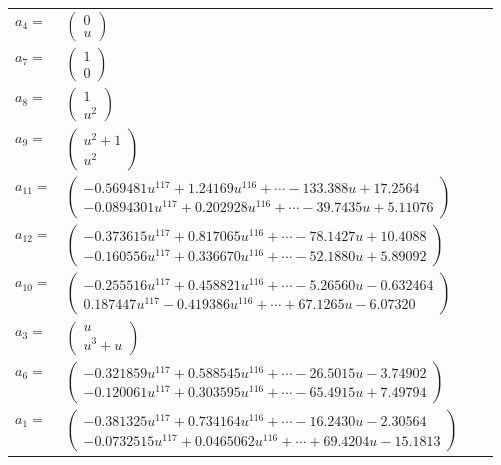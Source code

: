 \documentclass[1p]{elsarticle_modified}
\theoremstyle{definition}
\begin{document}
\begin{tabular}{m{7pt} m{180pt} m{7pt} m{180pt} }
\flushright $a_{4}=$&$\begin{pmatrix}0\\u\end{pmatrix}$ \\
\flushright $a_{7}=$&$\begin{pmatrix}1\\0\end{pmatrix}$ \\
\flushright $a_{8}=$&$\begin{pmatrix}1\\u^2\end{pmatrix}$ \\
\flushright $a_{9}=$&$\begin{pmatrix}u^2+1\\u^2\end{pmatrix}$ \\
\flushright $a_{11}=$&$\begin{pmatrix}-0.569481 u^{117}+1.24169 u^{116}+\cdots-133.388 u+17.2564\\-0.0894301 u^{117}+0.202928 u^{116}+\cdots-39.7435 u+5.11076\end{pmatrix}$ \\
\flushright $a_{12}=$&$\begin{pmatrix}-0.373615 u^{117}+0.817065 u^{116}+\cdots-78.1427 u+10.4088\\-0.160556 u^{117}+0.336670 u^{116}+\cdots-52.1880 u+5.89092\end{pmatrix}$ \\
\flushright $a_{10}=$&$\begin{pmatrix}-0.255516 u^{117}+0.458821 u^{116}+\cdots-5.26560 u-0.632464\\0.187447 u^{117}-0.419386 u^{116}+\cdots+67.1265 u-6.07320\end{pmatrix}$ \\
\flushright $a_{3}=$&$\begin{pmatrix}u\\u^3+u\end{pmatrix}$ \\
\flushright $a_{6}=$&$\begin{pmatrix}-0.321859 u^{117}+0.588545 u^{116}+\cdots-26.5015 u-3.74902\\-0.120061 u^{117}+0.303595 u^{116}+\cdots-65.4915 u+7.49794\end{pmatrix}$ \\
\flushright $a_{1}=$&$\begin{pmatrix}-0.381325 u^{117}+0.734164 u^{116}+\cdots-16.2430 u-2.30564\\-0.0732515 u^{117}+0.0465062 u^{116}+\cdots+69.4204 u-15.1813\end{pmatrix}$ \\

\end{tabular}
\end{document}

